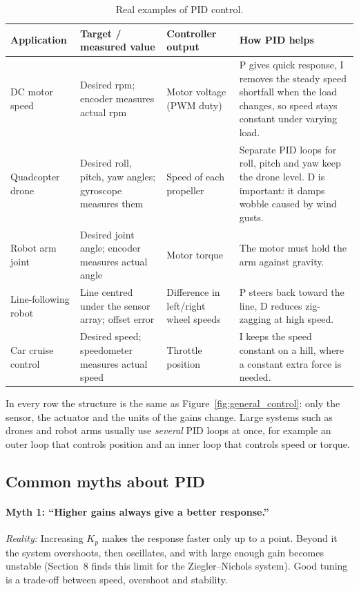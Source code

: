 \documentclass[]{article}
\begin{document}
\begin{table}[h]
	\centering
	\small
	\begin{tabularx}{\textwidth}{XXXX}
		\toprule
		Application & Target / measured value & Controller output & How PID helps \\
		\midrule
		DC motor speed & Desired rpm; encoder measures actual rpm & Motor voltage (PWM duty) & P gives quick response, I removes the steady speed shortfall when the load changes, so speed stays constant under varying load. \\ \addlinespace
		Quadcopter drone & Desired roll, pitch, yaw angles; gyroscope measures them & Speed of each propeller & Separate PID loops for roll, pitch and yaw keep the drone level. D is important: it damps wobble caused by wind gusts. \\ \addlinespace
		Robot arm joint & Desired joint angle; encoder measures actual angle & Motor torque & The motor must hold the arm against gravity. \\ \addlinespace
		Line-following robot & Line centred under the sensor array; offset error & Difference in left/right wheel speeds & P steers back toward the line, D reduces zig-zagging at high speed. \\ \addlinespace
		Car cruise control & Desired speed; speedometer measures actual speed & Throttle position & I keeps the speed constant on a hill, where a constant extra force is needed. \\
		\bottomrule
	\end{tabularx}
	\caption{Real examples of PID control.}
	\label{tab:examples}
\end{table}

In every row the structure is the same as Figure~\ref{fig:general_control}: only the sensor, the actuator and the units of the gains change. Large systems such as drones and robot arms usually use \emph{several} PID loops at once, for example an outer loop that controls position and an inner loop that controls speed or torque.

\subsection{Common myths about PID}

\paragraph{Myth 1: ``Higher gains always give a better response.''}
\emph{Reality:} Increasing $K_p$ makes the response faster only up to a point. Beyond it the system overshoots, then oscillates, and with large enough gain becomes unstable (Section~8 finds this limit for the Ziegler--Nichols system). Good tuning is a trade-off between speed, overshoot and stability.
\end{document}
